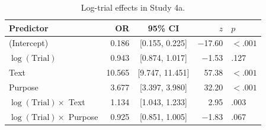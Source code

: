\documentclass[pdflatex,sn-nature]{sn-jnl}
\begin{document}
\begin{appendices}
\begin{table}[htbp]
\caption{Log-trial effects in Study 4a.}
\label{tab:S14}
\begin{tabular*}{\textwidth}{@{\extracolsep{\fill}}lrcrl@{}}
\toprule
Predictor & OR & 95\% CI & $z$ & $p$ \\
\midrule
(Intercept)                      & 0.186 & [0.155, 0.225] & $-$17.60 & $<.001$ \\
$\log(\text{Trial})$             & 0.943 & [0.874, 1.017] & $-$1.53  & .127    \\
Text                             & 10.565& [9.747, 11.451] & 57.38  & $<.001$ \\
Purpose                          & 3.677 & [3.397, 3.980] & 32.20   & $<.001$ \\
$\log(\text{Trial}) \times$ Text & 1.134 & [1.043, 1.233] & 2.95    & .003    \\
$\log(\text{Trial}) \times$ Purpose & 0.925 & [0.851, 1.005] & $-$1.83 & .067 \\
\bottomrule
\end{tabular*}
\end{table}


\end{appendices}
\end{document}
